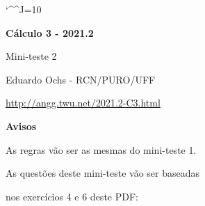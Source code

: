 \documentclass[oneside,12pt]{article}
\begin{document}
\catcode`\^^J=10
%
\pu
\def\pictgridstyle{\color{GrayPale}\linethickness{0.3pt}}
\def\pictaxesstyle{\linethickness{0.5pt}}



\def\u#1{\par{\footnotesize \url{#1}}}

\def\drafturl{http://angg.twu.net/LATEX/2021-2-C3.pdf}
\def\drafturl{http://angg.twu.net/2021.2-C3.html}
\def\draftfooter{\tiny \href{\drafturl}{\jobname{}} \ColorBrown{\shorttoday{} \hours}}



%

\thispagestyle{empty}

\begin{center}

\vspace*{1.2cm}

{\bf \Large Cálculo 3 - 2021.2}

\bsk

Mini-teste 2

\bsk

Eduardo Ochs - RCN/PURO/UFF

\url{http://angg.twu.net/2021.2-C3.html}

\end{center}

\newpage



{\bf Avisos}

As regras vão ser as mesmas do mini-teste 1.

\msk

As questões deste mini-teste vão ser baseadas

nos exercícios 4 e 6 deste PDF:

\ssk
\end{document}
